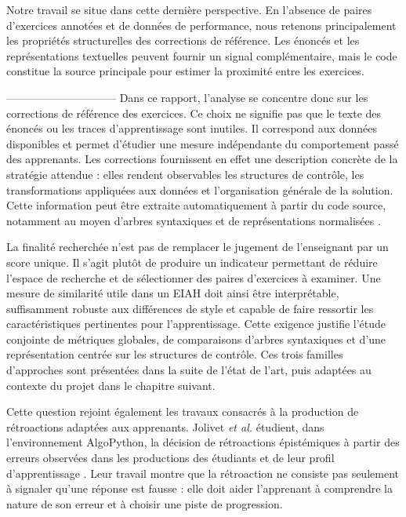 Notre travail se situe dans cette dernière perspective. En l'absence de paires d'exercices 
annotées et de données de performance, nous retenons principalement les propriétés structurelles
 des corrections de référence. Les énoncés et les représentations textuelles peuvent fournir un 
 signal complémentaire, mais le code constitue la source principale pour estimer la proximité 
 entre les exercices.





------------------------------
Dans ce rapport, l'analyse se concentre donc sur les corrections de référence
des exercices. Ce choix ne signifie pas que le texte des énoncés ou les
traces d'apprentissage sont inutiles. Il correspond aux données disponibles
et permet d'étudier une mesure indépendante du comportement passé des
apprenants. Les corrections fournissent en effet une description concrète de
la stratégie attendue : elles rendent observables les structures de contrôle,
les transformations appliquées aux données et l'organisation générale de la
solution. Cette information peut être extraite automatiquement à partir du
code source, notamment au moyen d'arbres syntaxiques et de représentations
normalisées \cite{baxter_clone_1998,wang_detection_2014}.

La finalité recherchée n'est pas de remplacer le jugement de l'enseignant
par un score unique. Il s'agit plutôt de produire un indicateur permettant de
réduire l'espace de recherche et de sélectionner des paires d'exercices à
examiner. Une mesure de similarité utile dans un EIAH doit ainsi être
interprétable, suffisamment robuste aux différences de style et capable de
faire ressortir les caractéristiques pertinentes pour l'apprentissage. Cette
exigence justifie l'étude conjointe de métriques globales, de comparaisons
d'arbres syntaxiques et d'une représentation centrée sur les structures de
contrôle. Ces trois familles d'approches sont présentées dans la suite de
l'état de l'art, puis adaptées au contexte du projet dans le chapitre
suivant.

Cette question rejoint également les travaux consacrés à la production de
rétroactions adaptées aux apprenants. Jolivet \emph{et al.} étudient, dans
l'environnement AlgoPython, la décision de rétroactions épistémiques à partir
des erreurs observées dans les productions des étudiants et de leur profil
d'apprentissage \cite{jolivet_modelisation_2025}. Leur travail montre que la
rétroaction ne consiste pas seulement à signaler qu'une réponse est fausse :
elle doit aider l'apprenant à comprendre la nature de son erreur et à choisir
une piste de progression.

